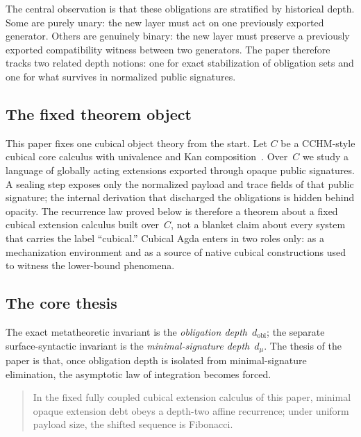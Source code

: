 \documentclass{lmcs}
\begin{document}
The central observation is that these obligations are stratified by historical depth. Some are purely unary: the new layer must act on one previously exported generator. Others are genuinely binary: the new layer must preserve a previously exported compatibility witness between two generators. The paper therefore tracks two related depth notions: one for exact stabilization of obligation sets and one for what survives in normalized public signatures.

\subsection{The fixed theorem object}

This paper fixes one cubical object theory from the start. Let $C$ be a CCHM-style cubical core calculus with univalence and Kan composition~\cite{cubical,cchm-hits}. Over~$C$ we study a language of globally acting extensions exported through opaque public signatures. A sealing step exposes only the normalized payload and trace fields of that public signature; the internal derivation that discharged the obligations is hidden behind opacity. The recurrence law proved below is therefore a theorem about a fixed cubical extension calculus built over~$C$, not a blanket claim about every system that carries the label ``cubical.'' Cubical Agda enters in two roles only: as a mechanization environment and as a source of native cubical constructions used to witness the lower-bound phenomena.

\subsection{The core thesis}

The exact metatheoretic invariant is the \emph{obligation depth}~$d_{\mathrm{obl}}$; the separate surface-syntactic invariant is the \emph{minimal-signature depth}~$d_\mu$. The thesis of the paper is that, once obligation depth is isolated from minimal-signature elimination, the asymptotic law of integration becomes forced.

\begin{quote}
In the fixed fully coupled cubical extension calculus of this paper, minimal opaque extension debt obeys a depth-two affine recurrence; under uniform payload size, the shifted sequence is Fibonacci.
\end{quote}
\end{document}
